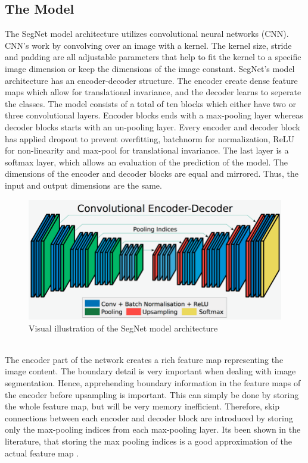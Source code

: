 \documentclass{article}
\begin{document}
\subsection{The Model}
%
The SegNet model architecture utilizes convolutional neural networks (CNN). CNN's work by convolving over an image with a kernel. The kernel size, stride and padding are all adjustable parameters that help to fit the kernel to a specific image dimension or keep the dimensions of the image constant. 
SegNet's model architecture has an encoder-decoder structure. The encoder create dense feature maps which allow for translational invariance, and the decoder learns to seperate the classes. The model consists of a total of ten blocks which either have two or three convolutional layers. Encoder blocks ends with a max-pooling layer whereas decoder blocks starts with an un-pooling layer. Every encoder and decoder block has applied dropout to prevent overfitting, batchnorm for normalization, ReLU for non-linearity and max-pool for translational invariance. The last layer is a softmax layer, which allows an evaluation of the prediction of the model. The dimensions of the encoder and decoder blocks are equal and mirrored. Thus, the input and output dimensions are the same.
\begin{figure}[!h]
	\centering
	\includegraphics[width=0.8\linewidth]{../../poster/Encoder-Decoder2}
	\caption{Visual illustration of the SegNet model architecture}
	\label{fig:encoder-decoder2}
\end{figure}
\\
The encoder part of the network creates a rich feature map representing the image content. The boundary detail is very important when dealing with image segmentation. Hence, apprehending boundary information in the feature maps of the encoder before upsampling is important. This can simply be done by storing the whole feature map, but will be very memory inefficient. Therefore, skip connections between each encoder and decoder block are introduced by storing only the max-pooling indices from each max-pooling layer. Its been shown in the literature, that storing the max pooling indices is a good approximation of the actual feature map \cite{seg}. 
\end{document}
